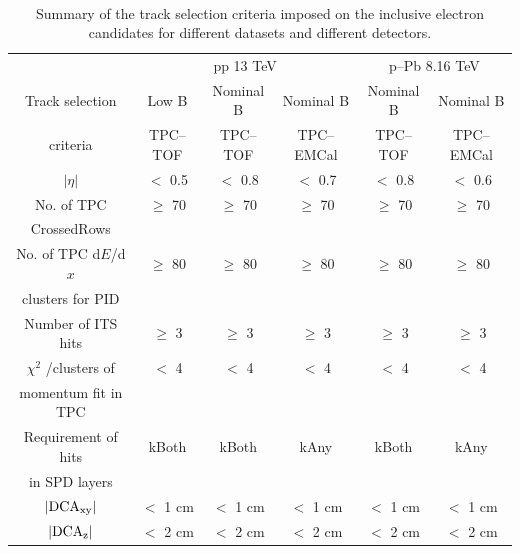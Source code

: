 \begin{table}[h!]
\caption{Summary of the track selection criteria imposed on the inclusive electron candidates for different datasets and different detectors.} \\
\centering
\small
\begin{tabular}{c|ccc|cc}
\hline\hline
 & \multicolumn{3}{c|}{pp 13 TeV} & \multicolumn{2}{c}{p--Pb 8.16 TeV}  \\ 
 Track selection & Low B & Nominal B  & Nominal B & Nominal B & Nominal B \\
  criteria & TPC--TOF & TPC--TOF  & TPC--EMCal & TPC--TOF & TPC--EMCal \\

\hline 
$|\eta|$ & $<$ 0.5 & $<$ 0.8 & $<$ {0.7} & $<$ 0.8 & $<$ 0.6 \\
{No. of TPC } & $\geq$ 70 & $\geq$ 70  &  $\geq$  70   & $\geq$ 70  & $\geq$ 70   \\
CrossedRows &  &  &   &   & \\
No. of TPC d$E$/d$x$& $\geq$ 80 & $\geq$ 80 &  $\geq$ {80} & $\geq$ 80 & $\geq$ 80\\
 clusters for PID &  &  & &\\
Number of ITS hits & $\geq$ {3} & $\geq$ {3}& $\geq$ {3} & $\geq$ 3& $\geq$ 3\\

$\chi^{2}$ /clusters of & $<$ 4 & $<$ 4 & $<$ 4 &$<$ 4&$<$ 4\\
momentum fit in TPC &  &  &&\\
Requirement of hits & kBoth & kBoth & kAny & kBoth & kAny\\%
in SPD layers & & & & &\\
$|\rm DCA_{xy}|$ & $<$ 1 cm & $<$ 1 cm & $<$ 1 cm & $<$ 1 cm& $<$ 1 cm\\
$|\rm DCA_{z}|$ & $<$ 2 cm & $<$ 2 cm & $<$ 2 cm & $<$ 2 cm & $<$ 2 cm\\
\hline
\end{tabular}
\label{Table:InclusiveTrackSelection}
\end{table}

